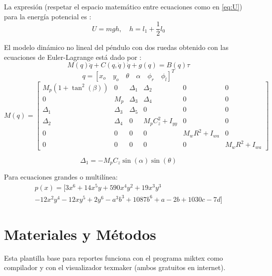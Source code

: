 \documentclass{article}
\begin{document}
La expresión (respetar el espacio matemático entre ecuaciones como en \eqref{eq:U}) para la energía potencial es \citep{Aguado2000}:
\begin{equation}
U=mgh,\quad h=l_1+\frac{1}{2}l_0%
\label{eq:U}
\end{equation}

El modelo dinámico no lineal del péndulo con dos ruedas obtenido con las ecuaciones de Euler-Lagrange está dado por \citep{HernandezBook2024}:
\begin{equation}
M(q)\ddot{q}+C(q,\dot{q})\dot{q}+g(q)=B(q)\tau
\label{eq:Mod_comp}
\end{equation}
\begin{equation}
q=[x_o\quad y_o\quad \theta\quad \alpha\quad \phi_r\quad \phi_l]^T
\label{eq:q}
\end{equation}
\begin{equation}
M(q)=\begin{bmatrix}
M_p(1+\tan^2{(\beta)}) & 0 & \Delta_1 & \Delta_2 & 0 & 0\\ 
0 & M_p & \Delta_3 & \Delta_4 & 0 & 0\\
\Delta_1 & \Delta_3 & \Delta_5 & 0 & 0 & 0\\
\Delta_2 & \Delta_4 & 0 & M_pC_z^2+I_{yy} & 0 & 0\\
0 & 0 & 0 & 0 & M_wR^2+I_{wa} & 0\\
0 & 0 & 0 & 0 & 0 & M_wR^2+I_{wa}
\end{bmatrix}
\label{eq:M}
\end{equation}

\begin{equation}
\Delta_1=-M_pC_z\sin(\alpha)\sin(\theta)
\label{eq:Delta1}
\end{equation}

Para ecuaciones grandes o multilínea:
\begin{multline}
p(x) = [3x^6 + 14x^5y + 590x^4y^2 + 19x^3y^3\\ 
- 12x^2y^4 - 12xy^5 + 2y^6 - a^3b^3+1087b^6 +a-2b+1030c-7d]
\label{eq:p_de_x}
\end{multline}



\section{Materiales y Métodos}
Esta plantilla base para reportes funciona con el programa miktex como compilador y con el visualizador texmaker (ambos gratuitos en internet).
\end{document}
